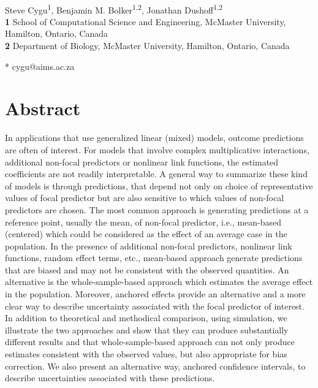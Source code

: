 \begin{flushleft}
{\Large
\textbf{} %
}
\newline
\\
Steve Cygu\textsuperscript{1},
Benjamin M. Bolker\textsuperscript{1,2},
Jonathan Dushoff\textsuperscript{1,2}
\\
\bigskip
\textbf{1} School of Computational Science and Engineering, McMaster University, Hamilton, Ontario, Canada
\\
\textbf{2} Department of Biology, McMaster University, Hamilton, Ontario, Canada
\\
\bigskip


* cygu@aims.ac.za

\end{flushleft}
\section*{Abstract}

In applications that use generalized linear (mixed) models, outcome predictions are often of interest. For models that involve complex multiplicative interactions, additional non-focal predictors or nonlinear link functions, the estimated coefficients are not readily interpretable. A general way to summarize these kind of models is through predictions, that depend not only on choice of representative values of focal predictor but are also sensitive to which values of non-focal predictors are chosen. The most common approach is generating predictions at a reference point, usually the mean, of non-focal predictor, i.e., mean-based (centered) which could be considered as the effect of an average case in the population. In the presence of additional non-focal predictors, nonlinear link functions, random effect terms, etc., mean-based approach generate predictions that are biased and may not be consistent with the observed quantities. An alternative is the whole-sample-based approach which estimates the average effect in the population. Moreover, anchored effects provide an alternative and a more clear way to describe uncertainty associated with the focal predictor of interest. In addition to theoretical and methodical comparison, using simulation, we illustrate the two approaches and show that they can produce substantially different results and that whole-sample-based approach can not only produce estimates consistent with the observed values, but also appropriate for bias correction. We also present an alternative way, anchored confidence intervals, to describe uncertainties associated with these predictions.

